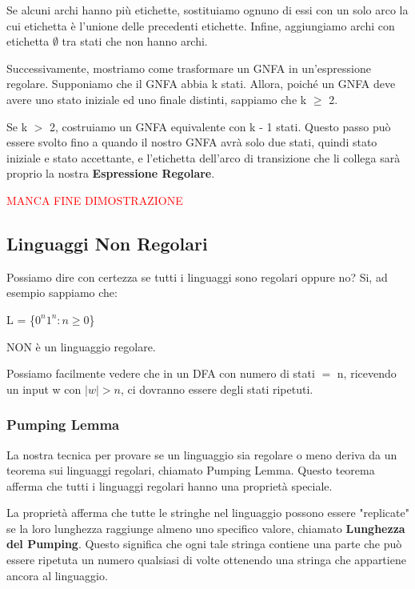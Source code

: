 \documentclass{article}
\begin{document}
Se alcuni archi hanno più etichette, sostituiamo ognuno di essi con un solo arco la cui etichetta è l'unione delle precedenti etichette. Infine, aggiungiamo archi con etichetta $\emptyset$ tra stati che non hanno archi. 

Successivamente, mostriamo come trasformare un GNFA in un'espressione regolare.
Supponiamo che il GNFA abbia k stati. Allora, poiché un GNFA deve avere uno stato iniziale ed uno finale distinti, sappiamo che k $\geq$ 2. 

Se k $>$ 2, costruiamo un GNFA equivalente con k - 1 stati. Questo passo può essere svolto fino a quando il nostro GNFA avrà solo due stati, quindi stato iniziale e stato accettante, e l'etichetta dell'arco di transizione che li collega sarà proprio la nostra \textbf{Espressione Regolare}.

\begin{center}
    \textcolor{red}{MANCA FINE DIMOSTRAZIONE}    
\end{center}

\subsection{Linguaggi Non Regolari}
Possiamo dire con certezza se tutti i linguaggi sono regolari oppure no? Si, ad esempio sappiamo che:

\begin{center}
    L = \{$0^n 1^n : n \geq 0$\}

    NON è un linguaggio regolare.
\end{center}

Possiamo facilmente vedere che in un DFA con numero di stati $=$ n, ricevendo un input w con $|w| > n$, ci dovranno essere degli stati ripetuti.

\subsubsection{Pumping Lemma}
La nostra tecnica per provare se un linguaggio sia regolare o meno deriva da un teorema sui linguaggi regolari, chiamato Pumping Lemma. Questo teorema afferma che tutti i linguaggi regolari hanno una proprietà speciale.

La proprietà afferma che tutte le stringhe nel linguaggio possono essere "replicate" se la loro lunghezza raggiunge almeno uno specifico valore, chiamato \textbf{Lunghezza del Pumping}. Questo significa che ogni tale stringa contiene una parte che può essere ripetuta un numero qualsiasi di volte ottenendo una stringa che appartiene ancora al linguaggio.
\end{document}
